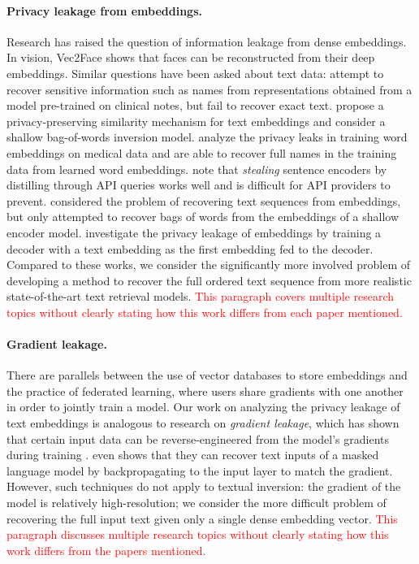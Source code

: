 \documentclass[11pt]{article}
\begin{document}
\paragraph{Privacy leakage from embeddings.} Research has raised the question of information leakage from dense embeddings. In vision, Vec2Face \cite{duong2020vec2face} shows that faces can be reconstructed from their deep embeddings. Similar questions have been asked about text data:
\citet{lehman2021does} attempt to recover sensitive information such as names from representations obtained from a model pre-trained on clinical notes, but fail to recover exact text. \citet{kim2022towardhomomorphic} propose a privacy-preserving similarity mechanism for text embeddings and consider a shallow bag-of-words inversion model. \citet{abdalla2020wordembeddingprivacy} analyze the privacy leaks in training word embeddings on medical data and are able to recover full names in the training data from learned word embeddings. \citet{dziedzic2023sentence} note that \textit{stealing} sentence encoders by distilling through API queries works well and is difficult for API providers to prevent. \citet{song2020informationleakage} considered the problem of recovering text sequences from embeddings, but only attempted to recover bags of words from the embeddings of a shallow encoder model. \citet{li2023sentence} investigate the privacy leakage of embeddings by training a decoder with a text embedding as the first embedding fed to the decoder. Compared to these works, we consider the significantly more involved problem of developing a method to recover the full ordered text sequence from more realistic state-of-the-art text retrieval models.
\textcolor{red}{This paragraph covers multiple research topics without clearly stating how this work differs from each paper mentioned.}

\paragraph{Gradient leakage.}
There are parallels between the use of vector databases to store embeddings and the practice of federated learning, where users share gradients with one another in order to jointly train a model. Our work on analyzing the privacy leakage of text embeddings is analogous to research on \textit{gradient leakage}, which has shown that certain input data can be reverse-engineered from the model's gradients during training \cite{melis2018exploiting,zhu2019deepgradientleakage,zhao2020idlg,geiping2020inverting}.
\citet{zhu2019deepgradientleakage} even shows that they can recover text inputs of a masked language model by backpropagating to the input layer to match the gradient. However, such techniques do not apply to textual inversion: the gradient of the model is relatively high-resolution; we consider the more difficult problem of recovering the full input text given only a single dense embedding vector.
\textcolor{red}{This paragraph discusses multiple research topics without clearly stating how this work differs from the papers mentioned.}
\end{document}
